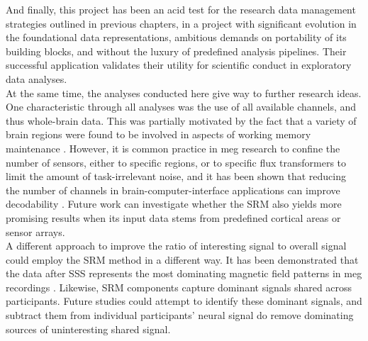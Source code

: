 And finally, this project has been an acid test for the research data management strategies outlined in previous chapters, in a project with significant evolution in the foundational data representations, ambitious demands on portability of its building blocks, and without the luxury of predefined analysis pipelines.
Their successful application validates their utility for scientific conduct in exploratory data analyses.\\
At the same time, the analyses conducted here give way to further research ideas.
One characteristic through all analyses was the use of all available channels, and thus whole-brain data.
This was partially motivated by the fact that a variety of brain regions were found to be involved in aspects of working memory maintenance \citet{sreenivasan2019and}.
However, it is common practice in \gls{meg} research to confine the number of sensors, either to specific regions, or to specific flux transformers \citep{garces2017choice} to limit the amount of task-irrelevant noise, and it has been shown that reducing the number of channels in brain-computer-interface applications can improve decodability \citep{roy2020assessing}.
Future work can investigate whether the \gls{SRM} also yields more promising results when its input data stems from predefined cortical areas or sensor arrays.\\
A different approach to improve the ratio of interesting signal to overall signal could employ the \gls{SRM} method in a different way.
It has been demonstrated that the data after \gls{SSS} represents the most dominating magnetic field patterns in \gls{meg} recordings \citep{garces2017choice}.
Likewise, \gls{SRM} components capture dominant signals shared across participants.
Future studies could attempt to identify these dominant signals, and subtract them from individual participants' neural signal do remove dominating sources of uninteresting shared signal.



